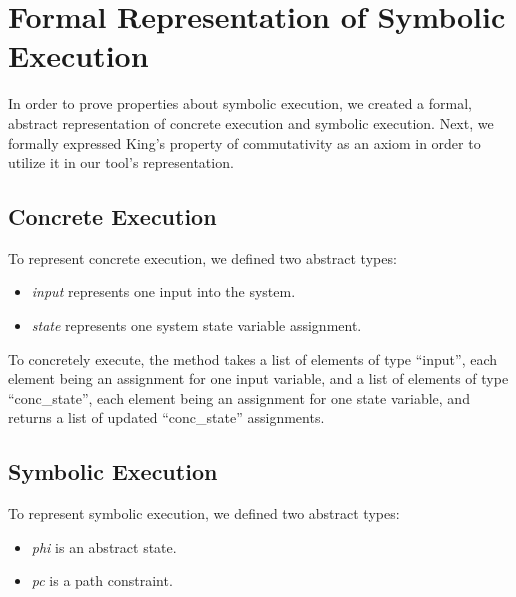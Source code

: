 \section{Formal Representation of Symbolic Execution}
In order to prove properties about symbolic execution, we created a formal, abstract representation of concrete execution and symbolic execution.
Next, we formally expressed King's property of commutativity as an axiom in order to utilize it in our tool's representation.

\subsection{Concrete Execution}
To represent concrete execution, we defined two abstract types: 
\begin{itemize}
\item \textit{input} represents one input into the system.
\item \textit{state}  represents one system state variable assignment.
\end{itemize}

To concretely execute, the method takes a list of elements of type ``input'', each element being an assignment for one input variable, and a list of elements of type ``conc\_state'', each element being an assignment for one state variable,
and returns a list of updated  ``conc\_state'' assignments.




\subsection{Symbolic Execution}

To represent symbolic execution, we defined two abstract types:
\begin{itemize}
\item \textit{phi} is an abstract state.
\item \textit{pc} is a path constraint.
\end{itemize}

